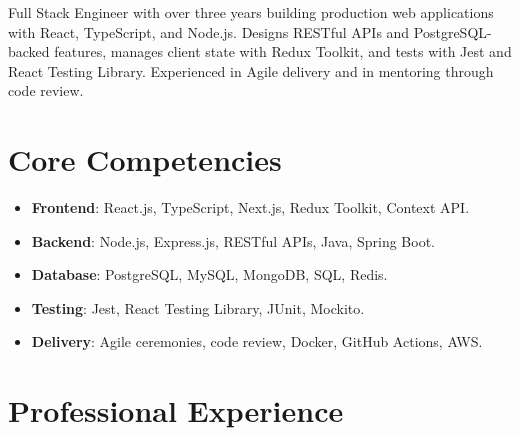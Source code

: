 \documentclass[11pt,a4paper,sans]{moderncv}
\begin{document}
\makecvtitle

\vspace{6pt}
{\small Full Stack Engineer with over three years building production web applications with React, TypeScript, and Node.js. Designs RESTful APIs and PostgreSQL-backed features, manages client state with Redux Toolkit, and tests with Jest and React Testing Library. Experienced in Agile delivery and in mentoring through code review.\par}

\section{Core Competencies}
\vspace{1pt}
\begin{itemize}

\item \textbf{Frontend}: React.js, TypeScript, Next.js, Redux Toolkit, Context API.

\item \textbf{Backend}: Node.js, Express.js, RESTful APIs, Java, Spring Boot.

\item \textbf{Database}: PostgreSQL, MySQL, MongoDB, SQL, Redis.

\item \textbf{Testing}: Jest, React Testing Library, JUnit, Mockito.

\item \textbf{Delivery}: Agile ceremonies, code review, Docker, GitHub Actions, AWS.

\end{itemize}

\section{Professional Experience}
\vspace{3pt}
\end{document}
